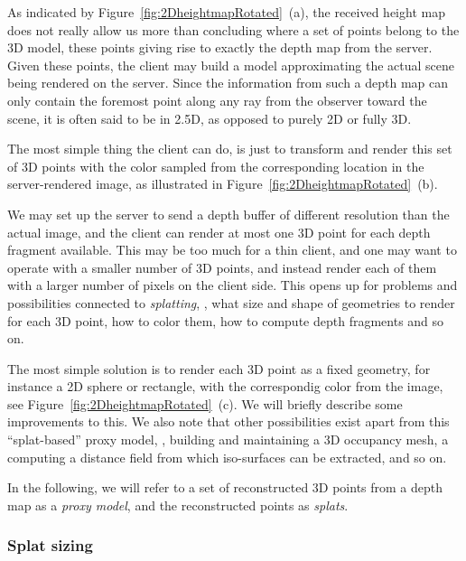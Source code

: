 
As indicated by Figure~\ref{fig:2DheightmapRotated}~(a), the received
height map does not really allow us more than concluding where a set of points
belong to the 3D model, these points giving rise to exactly the depth map from
the server. Given these points, the client may build a model approximating the
actual scene being rendered on the server. Since the information from such a
depth map can only contain the foremost point along any ray from the observer
toward the scene, it is often said to be in 2.5D, as opposed to purely 2D or
fully 3D.

The most simple thing the client can do, is just to transform and render this
set of 3D points with the color sampled from the corresponding location in the
server-rendered image, as illustrated in
Figure~\ref{fig:2DheightmapRotated}~(b).

We may set up the server to send a depth buffer of different resolution than the
actual image, and the client can render at most one 3D point for each depth
fragment available. This may be too much for a thin client, and one may want to
operate with a smaller number of 3D points, and instead render each of them with
a larger number of pixels on the client side. This opens up for problems and
possibilities connected to {\em splatting}, \eg, what size and shape of
geometries to render for each 3D point, how to color them, how to compute depth
fragments and so on.

The most simple solution is to render each 3D point as a fixed geometry, for
instance a 2D sphere or rectangle, with the correspondig color from the image,
see Figure~\ref{fig:2DheightmapRotated}~(c). We will briefly describe some
improvements to this. We also note that other possibilities exist apart
from this ``splat-based'' proxy model, \eg, building and maintaining a 3D
occupancy mesh, a computing a distance field from which iso-surfaces can be
extracted, and so on.

In the following, we will refer to a set of reconstructed 3D points from a depth
map as a {\em proxy model}, and the reconstructed points as {\em splats}.

\subsubsection{Splat sizing}

